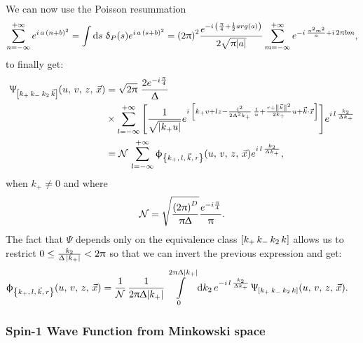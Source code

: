 We can now use the Poisson resummation
\begin{equation}
  \infinfsum{n}
  e^{i\, a\, (n + b)^2}
  =
  \int \dd{s}\,
  \delta_P(s) e^{i\, a\, (s + b)^2}
  =
  \qty(2\pi)^2
  \frac{e^{-i\, \qty( \frac{\pi}{4} + \frac{1}{2} arg(a) ) }}{2 \sqrt{\pi \abs{a}}}
  \infinfsum{m} e^{-i\, \frac{\pi^2 m^2}{a} + i\, 2 \pi b m},
\end{equation}
to finally get:\footnotemark{}
\begin{equation}
  \begin{split}
    \Psi_{\qty[k_+\, k_-\, k_2\, \vec{k}]}\qty(u,\, v,\, z,\, \vec{x})
    & =
    \sqrt{2\pi}~
    \frac{2 e^{-i \frac{\pi}{4}}}{\Delta}
    \\
    & \times
    \infinfsum{l}
    \qty[
      \frac{1}{\sqrt{\abs{k_+ u}}}
      e^{%
        i\, \qty[%
          k_+ v
          +
          l z
          -
          \frac{l^2}{2 \Delta^2 k_+}\, \frac{1}{u}
          +
          \frac{r + \norm{\vec{k}}^2}{2 k_+} u
          +
          \vec{k} \cdot \vec{x}
        ]
      }
    ]
    e^{i\, l\, \frac{k_2}{\Delta k_+}}
    \\
    & =
    \cN\,
    \infinfsum{l}
    \phi_{\kmkr}\qty(u,\, v,\, z,\, \vec{x})    
    e^{i\, l\, \frac{k_2}{\Delta k_+}},
  \end{split}
\label{eq:Psi_phi}
\end{equation}
when $k_+ \neq 0$ and where
\begin{equation}
  \cN
  =
  \sqrt{\frac{\qty(2\pi)^D}{\pi \Delta}}
  \frac{e^{-i \frac{\pi}{4}}}{\pi}.
\end{equation}
The fact that $\Psi$ depends only on the equivalence class $\qty[k_+\, k_-\, k_2\, k]$ allows us to restrict $0 \le \frac{k_2}{\Delta\, \abs{k_+}} < 2 \pi$ so that we can invert the previous expression and get:
\begin{equation}
  \begin{split}
    \phi_{\kmkr}\qty(u,\, v,\, z,\, \vec{x})    
    & =
    \frac{1}{\cN}\,
    \frac{1}{2 \pi \Delta \abs{k_+}}
    \finiteint{k_2}{0}{2 \pi \Delta \abs{k_+}}
    e^{-i\, l\, \frac{k_2}{\Delta k_+}}\,
    \Psi_{\qty[k_+\, k_-\, k_2\, k]}\qty(u,\, v,\, z,\, \vec{x}).
  \end{split}
\end{equation}


\subsubsection{Spin-1 Wave Function from Minkowski space}

